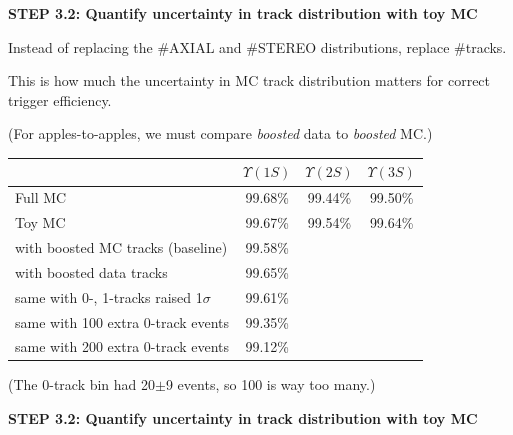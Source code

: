 \documentclass[landscape]{article}
\begin{document}
\pagebreak

\vspace{1 cm}

{\bf STEP 3.2: Quantify uncertainty in track distribution with toy MC}

\vfill

Instead of replacing the \#AXIAL and \#STEREO distributions, replace
\#tracks.

\vfill

This is how much the uncertainty in MC track distribution matters for
correct trigger efficiency.

\vfill

(For apples-to-apples, we must compare {\it boosted} data to {\it boosted} MC.)

\vfill

\begin{center}
  \renewcommand{\arraystretch}{1.25}
  \begin{tabular}{p{12 cm} c c c}
  & \mbox{\hspace{0.5 cm}} $\Upsilon(1S)$ \mbox{\hspace{0.5 cm}} & \mbox{\hspace{0.5 cm}} $\Upsilon(2S)$ \mbox{\hspace{0.5 cm}} & \mbox{\hspace{0.5 cm}} $\Upsilon(3S)$ \mbox{\hspace{0.5 cm}} \\\hline
  Full MC & 99.68\% & 99.44\% & 99.50\% \\
  Toy MC & 99.67\% & 99.54\% & 99.64\% \\
  with boosted MC tracks (baseline) & 99.58\% & & \\
  with boosted data tracks & 99.65\% & & \\
  same with 0-, 1-tracks raised 1$\sigma$ & 99.61\% & & \\
  same with 100 extra 0-track events & 99.35\% & & \\
  same with 200 extra 0-track events & 99.12\% & &
  \end{tabular}
\end{center}
\begin{flushright} (The 0-track bin had 20$\pm$9 events, so 100 is way too many.) \end{flushright}

\vfill

\pagebreak

\vspace{1 cm}

{\bf STEP 3.2: Quantify uncertainty in track distribution with toy MC}
\end{document}
